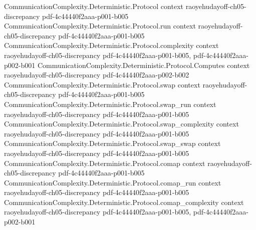 \begin{theorem}
\label{CommunicationComplexity.PublicCoin.lt_communicationComplexity_of_discrepancy_bound}
\leanok
{}
\proofstep
  {CommunicationComplexity.Deterministic.Protocol}
  {context}
  {raoyehudayoff-ch05-discrepancy}
  {pdf-4c44440f2aaa-p001-b005}
\proofstep
  {CommunicationComplexity.Deterministic.Protocol.run}
  {context}
  {raoyehudayoff-ch05-discrepancy}
  {pdf-4c44440f2aaa-p001-b005}
\proofstep
  {CommunicationComplexity.Deterministic.Protocol.complexity}
  {context}
  {raoyehudayoff-ch05-discrepancy}
  {pdf-4c44440f2aaa-p001-b005,
    pdf-4c44440f2aaa-p002-b001}
\proofstep
  {CommunicationComplexity.Deterministic.Protocol.Computes}
  {context}
  {raoyehudayoff-ch05-discrepancy}
  {pdf-4c44440f2aaa-p002-b002}
\proofstep
  {CommunicationComplexity.Deterministic.Protocol.swap}
  {context}
  {raoyehudayoff-ch05-discrepancy}
  {pdf-4c44440f2aaa-p001-b005}
\proofstep
  {CommunicationComplexity.Deterministic.Protocol.swap_run}
  {context}
  {raoyehudayoff-ch05-discrepancy}
  {pdf-4c44440f2aaa-p001-b005}
\proofstep
  {CommunicationComplexity.Deterministic.Protocol.swap_complexity}
  {context}
  {raoyehudayoff-ch05-discrepancy}
  {pdf-4c44440f2aaa-p001-b005}
\proofstep
  {CommunicationComplexity.Deterministic.Protocol.swap_swap}
  {context}
  {raoyehudayoff-ch05-discrepancy}
  {pdf-4c44440f2aaa-p001-b005}
\proofstep
  {CommunicationComplexity.Deterministic.Protocol.comap}
  {context}
  {raoyehudayoff-ch05-discrepancy}
  {pdf-4c44440f2aaa-p001-b005}
\proofstep
  {CommunicationComplexity.Deterministic.Protocol.comap_run}
  {context}
  {raoyehudayoff-ch05-discrepancy}
  {pdf-4c44440f2aaa-p001-b005}
\proofstep
  {CommunicationComplexity.Deterministic.Protocol.comap_complexity}
  {context}
  {raoyehudayoff-ch05-discrepancy}
  {pdf-4c44440f2aaa-p001-b005,
    pdf-4c44440f2aaa-p002-b001}

\end{theorem}
